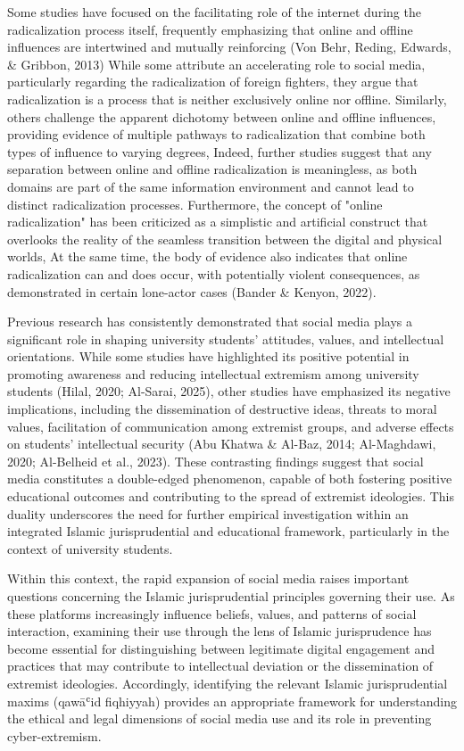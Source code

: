 \documentclass{NSP1}
\begin{document}
Some studies have focused on the facilitating role of the internet during the radicalization process itself, frequently emphasizing that online and offline influences are intertwined and mutually reinforcing (Von Behr, Reding, Edwards, \& Gribbon, 2013) While some attribute an accelerating role to social media, particularly regarding the radicalization of foreign fighters, they argue that radicalization is a process that is neither exclusively online nor offline. Similarly, others challenge the apparent dichotomy between online and offline influences, providing evidence of multiple pathways to radicalization that combine both types of influence to varying degrees, Indeed, further studies suggest that any separation between online and offline radicalization is meaningless, as both domains are part of the same information environment and cannot lead to distinct radicalization processes. Furthermore, the concept of "online radicalization" has been criticized as a simplistic and artificial construct that overlooks the reality of the seamless transition between the digital and physical worlds, At the same time, the body of evidence also indicates that online radicalization can and does occur, with potentially violent consequences, as demonstrated in certain lone-actor cases (Bander \& Kenyon, 2022).

Previous research has consistently demonstrated that social media plays a significant role in shaping university students' attitudes, values, and intellectual orientations. While some studies have highlighted its positive potential in promoting awareness and reducing intellectual extremism among university students (Hilal, 2020; Al-Sarai, 2025), other studies have emphasized its negative implications, including the dissemination of destructive ideas, threats to moral values, facilitation of communication among extremist groups, and adverse effects on students' intellectual security (Abu Khatwa \& Al-Baz, 2014; Al-Maghdawi, 2020; Al-Belheid et al., 2023). These contrasting findings suggest that social media constitutes a double-edged phenomenon, capable of both fostering positive educational outcomes and contributing to the spread of extremist ideologies. This duality underscores the need for further empirical investigation within an integrated Islamic jurisprudential and educational framework, particularly in the context of university students.

Within this context, the rapid expansion of social media raises important questions concerning the Islamic jurisprudential principles governing their use. As these platforms increasingly influence beliefs, values, and patterns of social interaction, examining their use through the lens of Islamic jurisprudence has become essential for distinguishing between legitimate digital engagement and practices that may contribute to intellectual deviation or the dissemination of extremist ideologies. Accordingly, identifying the relevant Islamic jurisprudential maxims (qawāʿid fiqhiyyah) provides an appropriate framework for understanding the ethical and legal dimensions of social media use and its role in preventing cyber-extremism.
\end{document}
